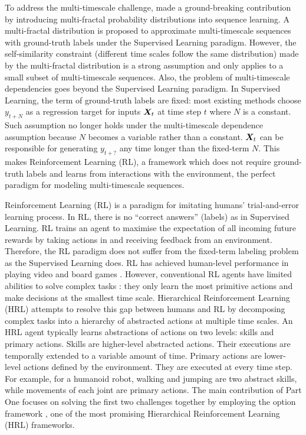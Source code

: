 To address the multi-timescale challenge,
 made a ground-breaking
contribution by introducing multi-fractal probability
distributions into sequence learning. A multi-fractal
distribution is proposed to approximate multi-timescale sequences
with ground-truth labels under the Supervised Learning paradigm.
However, the self-similarity constraint (different time scales
follow the same distribution) made by the multi-fractal
distribution is a strong assumption and only applies to a small
subset of multi-timescale sequences. Also, the problem of
multi-timescale dependencies goes beyond the Supervised Learning
paradigm. In Supervised Learning, the term of ground-truth labels
are fixed: most existing methods choose $y_{t+N}$ as a regression
target for inputs ${\bm{X}}_t$ at time step $t$ where $N$ is a
constant. Such assumption no longer holds under the
multi-timescale dependence assumption because $N$ becomes a
variable rather than a constant. ${\bm{X}}_t$ can be responsible for
generating $y_{t+?}$ any time longer than the fixed-term $N$.
This makes Reinforcement Learning \cite{sutton2018reinforcement}
(RL), a framework which does not require ground-truth labels and
learns from interactions with the environment, the perfect
paradigm for modeling multi-timescale sequences.

Reinforcement Learning (RL) is a paradigm for imitating humans'
trial-and-error learning process. In RL, there is no ``correct
answers'' (labels) as in Supervised Learning. RL trains an agent
to maximise the expectation of all incoming future rewards by
taking actions in and receiving feedback from an environment.
Therefore, the RL paradigm does not suffer from the fixed-term
labeling problem as the Supervised Learning does. RL has achieved
human-level performance in playing video and board games
\cite{mnih2015human,silver2016mastering}. However, conventional
RL agents have limited abilities to solve complex tasks
\cite{daniel2016probabilistic}: they only learn the most
primitive actions and make decisions at the smallest time scale.
Hierarchical Reinforcement Learning (HRL) attempts to resolve
this gap between humans and RL by decomposing complex tasks into
a hierarchy of abstracted actions at multiple time scales. An HRL
agent typically learns abstractions of actions on two levels:
skills and primary actions. Skills are higher-level abstracted
actions. Their executions are temporally extended to a variable
amount of time. Primary actions are lower-level actions defined
by the environment. They are executed at every time step. For
example, for a humanoid robot, walking and jumping are two
abstract skills, while movements of each joint are primary
actions. The main contribution of Part One focuses on solving the
first two challenges together by employing the option framework
\cite{sutton1999between}, one of the most promising Hierarchical
Reinforcement Learning (HRL) frameworks.

